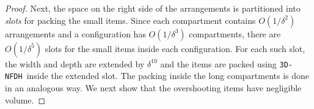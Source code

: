 \documentclass[10pt,a4paper]{amsart}
\newcommand{\tNFDH}{\texttt{3D-NFDH}\xspace}
\theoremstyle{definition}
\begin{document}
\begin{proof}
				
				
		

Next, the space on the right side of the arrangements is partitioned into \emph{slots} for packing the small items. Since each compartment contains $O(1/\delta^2)$ arrangements and a configuration has $O(1/\delta^3)$ compartments, there are $O(1/\delta^5)$ slots for the small items inside each configuration. For each such slot, the width and depth are extended by $\delta^{10}$ and the items are packed using \tNFDH~inside the extended slot. The packing inside the long compartments is done in an analogous way. We next show that the overshooting items have negligible volume.


\end{proof}
\end{document}
